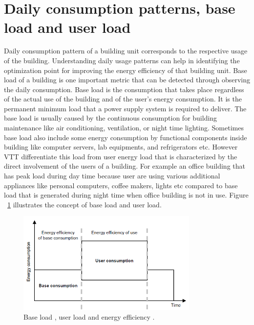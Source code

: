 \section{Daily consumption patterns, base load and user load} 
Daily consumption pattern of a building unit corresponds to the respective usage of the building. Understanding daily usage patterns can help in identifying the optimization point for improving the energy efficiency of that building unit. Base load of a building is one important metric that can be detected through observing the daily consumption. Base load is the consumption that takes place regardless of the actual use of the building and of the user's energy consumption\cite{forsstrommeasuring}. It is the permanent minimum load that a power supply system is required to deliver. The base load is usually caused by the continuous consumption for building maintenance like air conditioning, ventilation, or night time lighting. Sometimes base load also include some energy consumption by functional components inside building like computer servers, lab equipments, and refrigerators etc. However VTT differentiate this load from user energy load that is characterized by the direct involvement of the users of a building. For example an office building that has peak load during day time because user  are using various additional appliances like personal computers, coffee makers, lights etc compared to base load that is generated during night time when office building is not in use. Figure  ~\ref{fig:baseload} illustrates the concept of base load and user load.
\begin{figure}[ht]
  \begin{center}
    \includegraphics[width=0.8\textwidth]{images/baseload.png}
    \caption{ Base load , user load and energy efficiency \cite{forsstrommeasuring}.}
    \label{fig:baseload}
  \end{center}
\end{figure}

